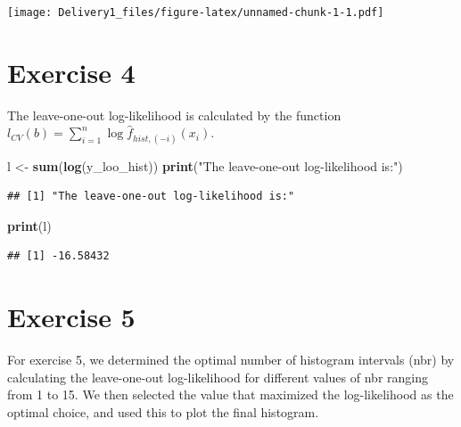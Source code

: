 \documentclass[
]{article}
\newenvironment{Shaded}{\begin{snugshade}}{\end{snugshade}}
\newcommand{\FunctionTok}[1]{\textcolor[rgb]{0.13,0.29,0.53}{\textbf{#1}}}
\newcommand{\NormalTok}[1]{#1}
\newcommand{\OtherTok}[1]{\textcolor[rgb]{0.56,0.35,0.01}{#1}}
\newcommand{\StringTok}[1]{\textcolor[rgb]{0.31,0.60,0.02}{#1}}
\begin{document}
\texttt{[image: Delivery1\_files/figure-latex/unnamed-chunk-1-1.pdf]}

\section{Exercise 4}\label{exercise-4}

The leave-one-out log-likelihood is calculated by the function
\(l_{C V}(b)=\sum_{i=1}^n \log \hat{f}_{hist,(-i)}\left(x_i\right)\).

\begin{Shaded}
\begin{Highlighting}[]
\NormalTok{l }\OtherTok{\textless{}{-}} \FunctionTok{sum}\NormalTok{(}\FunctionTok{log}\NormalTok{(y\_loo\_hist))}
\FunctionTok{print}\NormalTok{(}\StringTok{"The leave{-}one{-}out log{-}likelihood is:"}\NormalTok{)}
\end{Highlighting}
\end{Shaded}

\begin{verbatim}
## [1] "The leave-one-out log-likelihood is:"
\end{verbatim}

\begin{Shaded}
\begin{Highlighting}[]
\FunctionTok{print}\NormalTok{(l)}
\end{Highlighting}
\end{Shaded}

\begin{verbatim}
## [1] -16.58432
\end{verbatim}

\section{Exercise 5}\label{exercise-5}

For exercise 5, we determined the optimal number of histogram intervals
(nbr) by calculating the leave-one-out log-likelihood for different
values of nbr ranging from 1 to 15. We then selected the value that
maximized the log-likelihood as the optimal choice, and used this to
plot the final histogram.
\end{document}
